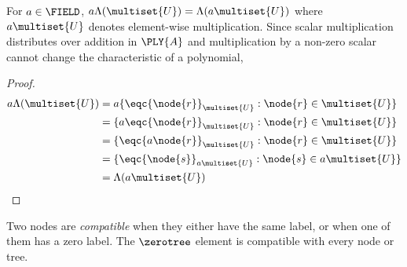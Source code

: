 \begin{proposition}\label{sLambda}
  For $a \in \FIELD$, $a \Lambda(\multiset{U}) = \Lambda(a\multiset{U})$ where $a\multiset{U}$ denotes element-wise
  multiplication. Since scalar multiplication distributes over
  addition in $\PLY{A}$ and multiplication by a non-zero scalar cannot
  change the characteristic of a polynomial, 
  \begin{proof}
    \begin{align*}
      a\Lambda(\multiset{U}) &= a \{\eqc{\node{r}}_{\multiset{U}}: \node{r}\in\multiset{U}\}\\ 
      &= \{a\eqc{\node{r}}_{\multiset{U}}: \node{r}\in\multiset{U}\}\\ 
      &= \{\eqc{a\node{r}}_{\multiset{U}}: \node{r}\in\multiset{U}\}\\
      &= \{\eqc{\node{s}}_{a\multiset{U}}: \node{s}\in a \multiset{U}\}\\
      &= \Lambda(a\multiset{U})
    \end{align*}
  \end{proof}
\end{proposition}

\begin{definition}
  Two nodes are \emph{compatible} when they either have the same label, or
  when one of them has a zero label.  The $\zerotree$ element is
  compatible with every node or tree.
\end{definition}

